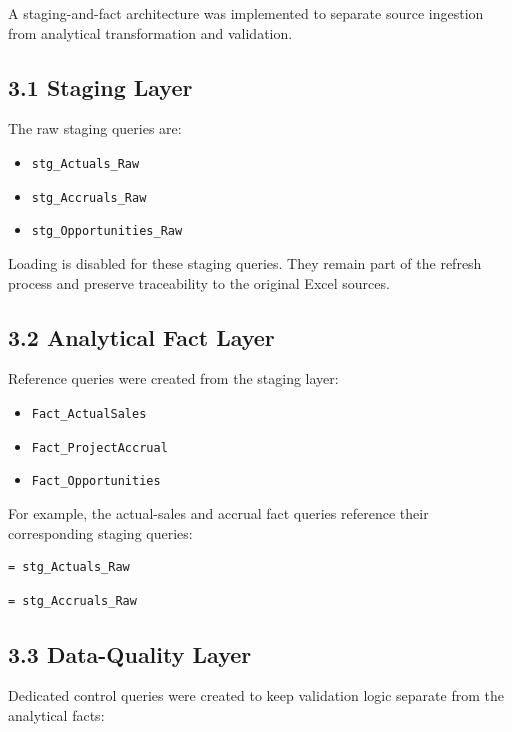 \documentclass[11pt,a4paper]{article}
\begin{document}
A staging-and-fact architecture was implemented to separate source
ingestion from analytical transformation and validation.

\subsection{3.1 Staging Layer}

The raw staging queries are:

\begin{itemize}[leftmargin=7mm,itemsep=2pt]
    \item \texttt{stg\_Actuals\_Raw}
    \item \texttt{stg\_Accruals\_Raw}
    \item \texttt{stg\_Opportunities\_Raw}
\end{itemize}

Loading is disabled for these staging queries. They remain part of the
refresh process and preserve traceability to the original Excel sources.

\subsection{3.2 Analytical Fact Layer}

Reference queries were created from the staging layer:

\begin{itemize}[leftmargin=7mm,itemsep=2pt]
    \item \texttt{Fact\_ActualSales}
    \item \texttt{Fact\_ProjectAccrual}
    \item \texttt{Fact\_Opportunities}
\end{itemize}

For example, the actual-sales and accrual fact queries reference their
corresponding staging queries:

\begin{lstlisting}[style=powerquery]
= stg_Actuals_Raw
\end{lstlisting}

\begin{lstlisting}[style=powerquery]
= stg_Accruals_Raw
\end{lstlisting}

\subsection{3.3 Data-Quality Layer}

Dedicated control queries were created to keep validation logic separate
from the analytical facts:
\end{document}
